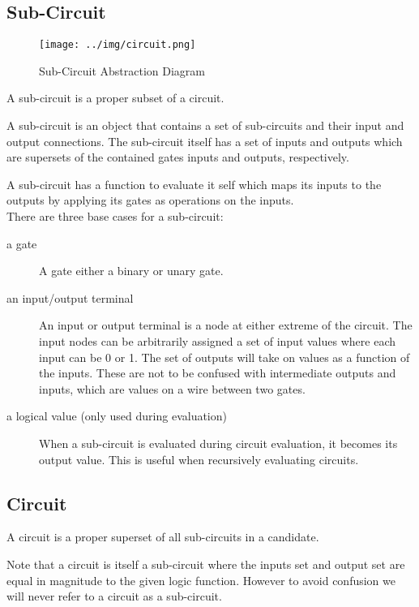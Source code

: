 \documentclass{article}
\begin{document}
\subsection{Sub-Circuit}
\label{sec-5-2}

\begin{figure}[hp]
\centering
\texttt{[image: ../img/circuit.png]}
\caption{\label{fig:circ}Sub-Circuit Abstraction Diagram}
\end{figure}

A sub-circuit is a proper subset of a circuit.

A sub-circuit is an object that contains a set of sub-circuits and their input
and output connections. The sub-circuit itself has a set of inputs and outputs
which are supersets of the contained gates inputs and outputs, respectively.

A sub-circuit has a function to evaluate it self which maps its inputs to the
outputs by applying its gates as operations on the inputs. \\

There are three base cases for a sub-circuit:
\begin{description}
\item[{a gate}] A gate either a binary or unary gate.
\item[{an input/output terminal}] An input or output terminal is a node at either extreme of the circuit. The
input nodes can be arbitrarily assigned a set of input values where each input
can be 0 or 1. The set of outputs will take on values as a function of the
inputs. These are not to be confused with intermediate outputs and inputs, which
are values on a wire between two gates.
\item[{a logical value (only used during evaluation)}] When a sub-circuit is evaluated during circuit evaluation, it becomes its
output value. This is useful when recursively evaluating circuits.
\end{description}

\subsection{Circuit}
\label{sec-5-3}

A circuit is a proper superset of all sub-circuits in a candidate.

Note that a circuit is itself a sub-circuit where the inputs set and output set
are equal in magnitude to the given logic function. However to avoid confusion
we will never refer to a circuit as a sub-circuit.
\end{document}

